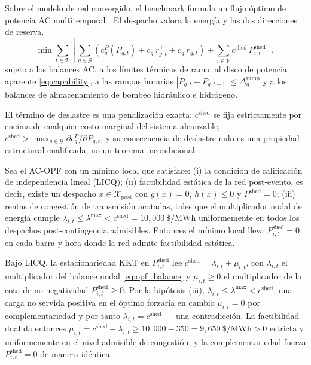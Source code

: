 Sobre el modelo de red convergido, el benchmark formula un flujo óptimo de potencia AC multitemporal \cite{molzahn2019}. El despacho valora la energía y las dos direcciones de reserva,
\begin{equation}
\min \sum_{t \in \mathcal{T}} \left[ \sum_{g \in \mathcal{G}} \left( c_g^{P}(P_{g,t}) + c_g^{+} r_{g,t}^{+} + c_g^{-} r_{g,t}^{-} \right) + \sum_{i \in \mathcal{V}} c^{\mathrm{shed}}\, P_{i,t}^{\mathrm{shed}} \right],
\label{eq:opfobj}
\end{equation}
sujeto a los balances AC, a los límites térmicos de rama, al disco de potencia aparente \eqref{eq:capability}, a las rampas horarias $|P_{g,t} - P_{g,t-1}| \le \Delta_g^{\mathrm{ramp}}$ y a los balances de almacenamiento de bombeo hidráulico e hidrógeno.

El término de deslastre es una penalización exacta: $c^{\mathrm{shed}}$ se fija estrictamente por encima de cualquier costo marginal del sistema alcanzable, $c^{\mathrm{shed}} > \max_{g \in \mathcal{G}} \partial c_g^{P} / \partial P_{g,t}$, y su consecuencia de deslastre nulo es una propiedad estructural cualificada, no un teorema incondicional.

\begin{proposition}
\label{prop:shed}
Sea el AC-OPF con un mínimo local que satisface: (i) la condición de calificación de independencia lineal (LICQ); (ii) factibilidad estática de la red post-evento, es decir, existe un despacho $x \in \mathcal{X}_{\mathrm{post}}$ con $g(x) = 0$, $h(x) \le 0$ y $P^{\mathrm{shed}} = 0$; (iii) rentas de congestión de transmisión acotadas, tales que el multiplicador nodal de energía cumple $\lambda_{i,t} \le \lambda^{\max} < c^{\mathrm{shed}} = 10{,}000\ \text{\$}/\mathrm{MWh}$ uniformemente en todos los despachos post-contingencia admisibles. Entonces el mínimo local lleva $P_{i,t}^{\mathrm{shed}} = 0$ en cada barra y hora donde la red admite factibilidad estática.
\end{proposition}

\begin{IEEEproof}[Demostración]
Bajo LICQ, la estacionariedad KKT en $P_{i,t}^{\mathrm{shed}}$ lee $c^{\mathrm{shed}} = \lambda_{i,t} + \mu_{i,t}$, con $\lambda_{i,t}$ el multiplicador del balance nodal \eqref{eq:opf_balance} y $\mu_{i,t} \ge 0$ el multiplicador de la cota de no negatividad $P_{i,t}^{\mathrm{shed}} \ge 0$. Por la hipótesis (iii), $\lambda_{i,t} \le \lambda^{\max} < c^{\mathrm{shed}}$; una carga no servida positiva en el óptimo forzaría en cambio $\mu_{i,t} = 0$ por complementariedad y por tanto $\lambda_{i,t} = c^{\mathrm{shed}}$ --- una contradicción. La factibilidad dual da entonces $\mu_{i,t} = c^{\mathrm{shed}} - \lambda_{i,t} \ge 10{,}000 - 350 = 9{,}650\ \text{\$}/\mathrm{MWh} > 0$ estricta y uniformemente en el nivel admisible de congestión, y la complementariedad fuerza $P_{i,t}^{\mathrm{shed}} = 0$ de manera idéntica.
\end{IEEEproof}

